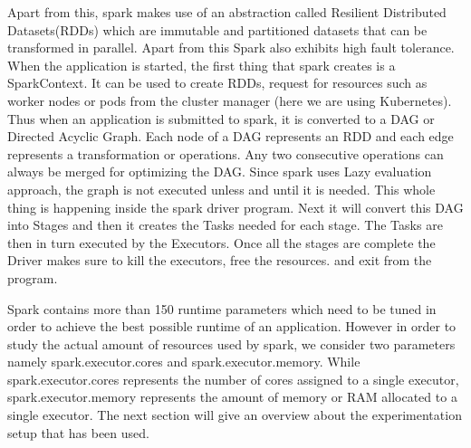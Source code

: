 \documentclass[11pt]{article}
\begin{document}
\par Apart from this, spark makes use of an abstraction called Resilient Distributed Datasets(RDDs) which are immutable and partitioned datasets that can be transformed in parallel. Apart from this Spark also exhibits high fault tolerance. When the application is started, the first thing that spark creates is a SparkContext. It can be used to create RDDs, request for resources such as worker nodes or pods from the cluster manager (here we are using Kubernetes). Thus when an application is submitted to spark, it is converted to a DAG or Directed Acyclic Graph. Each node of a DAG represents an RDD and each edge represents a transformation or operations. Any two consecutive operations can always be merged for optimizing the DAG. Since spark uses Lazy evaluation approach, the graph is not executed unless and until it is needed. This whole thing is happening inside the spark driver program. Next it will convert this DAG into Stages and then it creates the Tasks needed for each stage. The Tasks are then in turn executed by the Executors. Once all the stages are complete the Driver makes sure to kill the  executors, free the resources.  and exit from the program. 
\par Spark contains more than 150 runtime parameters which need to be tuned in order to achieve the best possible runtime of an application. However in order to study the actual amount of resources used by spark, we consider two parameters namely spark.executor.cores and spark.executor.memory. While spark.executor.cores represents the number of cores assigned to a single executor, spark.executor.memory represents the amount of memory or RAM allocated to a single executor. The next section will give an overview about the experimentation setup that has been used.
\end{document}
